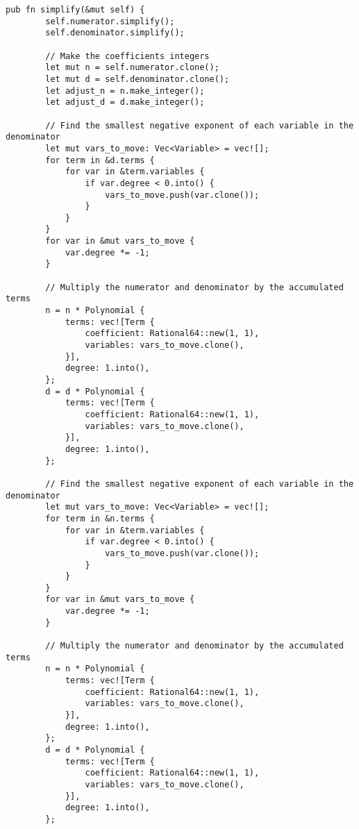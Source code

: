\begin{lstlisting}[caption={The implementation of the \texttt{simplify()} method for the \texttt{PolyRatio} struct}, label={lst:polyratio-simplify}]
    pub fn simplify(&mut self) {
        self.numerator.simplify();
        self.denominator.simplify();

        // Make the coefficients integers
        let mut n = self.numerator.clone();
        let mut d = self.denominator.clone();
        let adjust_n = n.make_integer();
        let adjust_d = d.make_integer();

        // Find the smallest negative exponent of each variable in the denominator
        let mut vars_to_move: Vec<Variable> = vec![];
        for term in &d.terms {
            for var in &term.variables {
                if var.degree < 0.into() {
                    vars_to_move.push(var.clone());
                }
            }
        }
        for var in &mut vars_to_move {
            var.degree *= -1;
        }

        // Multiply the numerator and denominator by the accumulated terms
        n = n * Polynomial {
            terms: vec![Term {
                coefficient: Rational64::new(1, 1),
                variables: vars_to_move.clone(),
            }],
            degree: 1.into(),
        };
        d = d * Polynomial {
            terms: vec![Term {
                coefficient: Rational64::new(1, 1),
                variables: vars_to_move.clone(),
            }],
            degree: 1.into(),
        };

        // Find the smallest negative exponent of each variable in the denominator
        let mut vars_to_move: Vec<Variable> = vec![];
        for term in &n.terms {
            for var in &term.variables {
                if var.degree < 0.into() {
                    vars_to_move.push(var.clone());
                }
            }
        }
        for var in &mut vars_to_move {
            var.degree *= -1;
        }

        // Multiply the numerator and denominator by the accumulated terms
        n = n * Polynomial {
            terms: vec![Term {
                coefficient: Rational64::new(1, 1),
                variables: vars_to_move.clone(),
            }],
            degree: 1.into(),
        };
        d = d * Polynomial {
            terms: vec![Term {
                coefficient: Rational64::new(1, 1),
                variables: vars_to_move.clone(),
            }],
            degree: 1.into(),
        };


\end{lstlisting}
